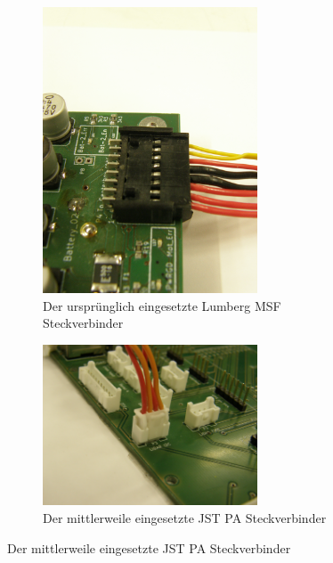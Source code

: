 \begin{figure}[H]

\begin{subfigure}{}
\includegraphics[width=0.7\textwidth, center]{bilder/Stecker/Stecker_Lumberg_MSF.jpg} 
\caption{Der ursprünglich eingesetzte Lumberg MSF Steckverbinder} 
\label{fig:Der ursprünglich eingesetzte Lumberg MSF Steckverbinder}
\end{subfigure}

\begin{subfigure}{}
\includegraphics[width=0.7\textwidth, center]{bilder/Stecker/Stecker_JST_PA.jpg} 
\caption{Der mittlerweile eingesetzte JST PA Steckverbinder} 
\label{fig:Der mittlerweile eingesetzte JST PA Steckverbinder}
\end{subfigure}

\end{figure}

